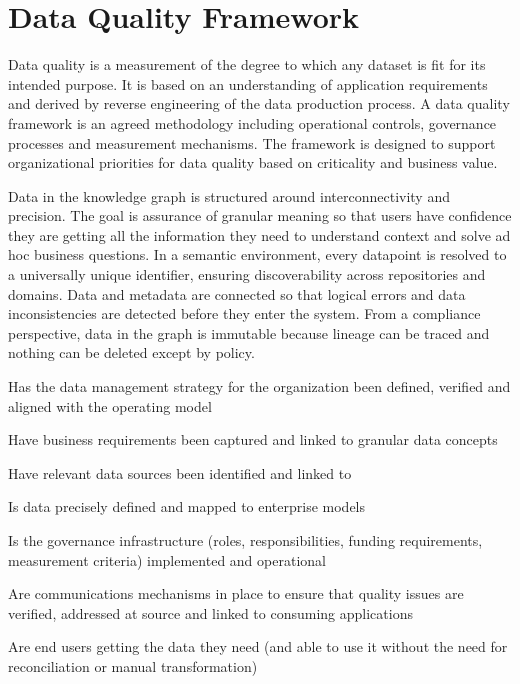 \section{Data Quality Framework}\label{sec:ekgmm-b-3-1} %

Data quality is a measurement of the degree to which any dataset is fit for its intended purpose.
It is based on an understanding of application requirements and derived by reverse engineering of the
data production process.
A data quality framework is an agreed methodology including operational controls, governance processes and
measurement mechanisms.
The framework is designed to support organizational priorities for data quality based on criticality and business value.

\kgmmekgrationalesection

Data in the knowledge graph is structured around interconnectivity and precision.
The goal is assurance of granular meaning so that users have confidence they are getting all the information they
need to understand context and solve ad hoc business questions.
In a semantic environment, every datapoint is resolved to a universally unique identifier, ensuring discoverability
across repositories and domains.
Data and metadata are connected so that logical errors and data inconsistencies are detected before they enter
the system.
From a compliance perspective, data in the graph is immutable because lineage can be traced and
nothing can be deleted except by policy.

\kgmmcorequestionssection

\begin{core-questions}

  \item [\thesection.1] Has the data management strategy for the organization been defined, verified and aligned
                        with the operating model
  \item [\thesection.2] Have business requirements been captured and linked to granular data concepts
  \item [\thesection.3] Have relevant data sources been identified and linked to 
  \item [\thesection.4] Is data precisely defined and mapped to enterprise models
  \item [\thesection.5] Is the governance infrastructure (roles, responsibilities, funding requirements,
                        measurement criteria) implemented and operational
  \item [\thesection.6] Are communications mechanisms in place to ensure that quality issues are verified,
                        addressed at source and linked to consuming applications
  \item [\thesection.7] Are end users getting the data they need (and able to use it without the need for
                        reconciliation or manual transformation)

\end{core-questions}

